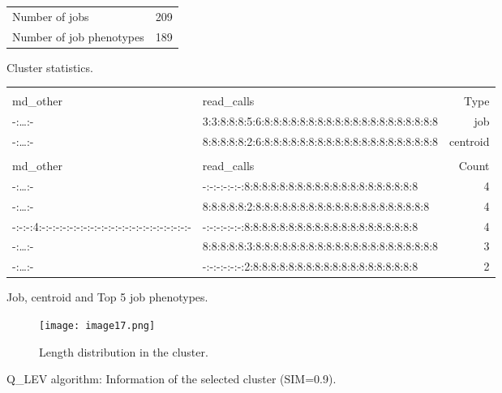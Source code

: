 \documentclass{jhps}
\begin{document}
\begin{figure}
	\begin{subtable}{\textwidth}
		\centering
		\begin{tabular}{ll}
			Number of jobs & 209 \\
			Number of job phenotypes & 189 \\
		\end{tabular}
		\caption{Cluster statistics.}
		\label{cluster:use_case:hex_lev:stats}
	\end{subtable}
	\medskip
	\begin{subtable}{\textwidth}
		\centering
		\begin{tiny}
			\begin{tabular}{ll|r}
				\rowcolor{tblhead}
				\multicolumn{2}{l|}{Q-coding} & \\
				\rowcolor{tblhead}
				md\_other                                           &  read\_calls                                           & Type     \\
				\hline
				-:\dots:-                                           &  3:3:8:8:8:5:6:8:8:8:8:8:8:8:8:8:8:8:8:8:8:8:8:8:8:8:8 & job      \\
				-:\dots:-                                           &  8:8:8:8:8:2:6:8:8:8:8:8:8:8:8:8:8:8:8:8:8:8:8:8:8:8:8 & centroid \\
				\multicolumn{3}{l}{}                                \\
				\rowcolor{tblhead}      md\_other                   &  read\_calls                                           & Count    \\
				\hline
				-:\dots:-                                           &  -:-:-:-:-:-:8:8:8:8:8:8:8:8:8:8:8:8:8:8:8:8:8:8:8:8   & 4        \\
				-:\dots:-                                           &  8:8:8:8:8:2:8:8:8:8:8:8:8:8:8:8:8:8:8:8:8:8:8:8:8:8   & 4        \\
				-:-:-:4:-:-:-:-:-:-:-:-:-:-:-:-:-:-:-:-:-:-:-:-:-:- &  -:-:-:-:-:-:8:8:8:8:8:8:8:8:8:8:8:8:8:8:8:8:8:8:8:8   & 4        \\
				-:\dots:-                                           &  8:8:8:8:8:3:8:8:8:8:8:8:8:8:8:8:8:8:8:8:8:8:8:8:8:8:8 & 3        \\
				-:\dots:-                                           &  -:-:-:-:-:-:2:8:8:8:8:8:8:8:8:8:8:8:8:8:8:8:8:8:8:8   & 2        \\
			\end{tabular}
		\end{tiny}
		\caption{Job, centroid and Top 5 job phenotypes.}
		\label{cluster:use_case:hex_lev:top_jobs}
	\end{subtable}
	\medskip
	\begin{subfigure}{\textwidth}
		\centering
		\texttt{[image: image17.png]}
		\caption{Length distribution in the cluster.}
		\label{cluster:use_case:hex_lev:length}
	\end{subfigure}
	\caption{Q\_LEV algorithm: Information of the selected cluster (SIM=0.9).}
	\label{cluster:use_case:hex_lev}
\end{figure}
\end{document}
